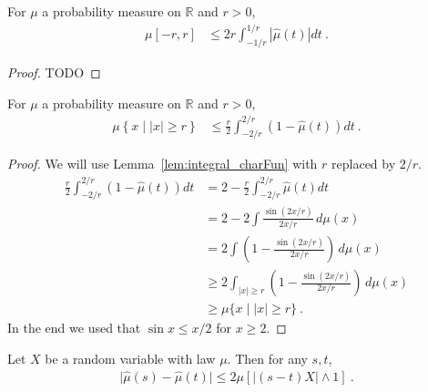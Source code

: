 \begin{lemma}\label{lem:charFun_bound_small}
\leanok
{}
For $\mu$ a probability measure on $\mathbb{R}$ and $r > 0$,
\begin{align*}
\mu [-r, r]
&\le 2 r \int_{-1/r}^{1/r} |\hat{\mu}(t)| dt
\: .
\end{align*}
\end{lemma}

\begin{proof}
TODO
\end{proof}


\begin{lemma}\label{lem:charFun_bound_large}
\leanok
{}
For $\mu$ a probability measure on $\mathbb{R}$ and $r > 0$,
\begin{align*}
\mu \left\{x \mid |x| \ge r\right\}
&\le \frac{r}{2} \int_{-2/r}^{2/r} (1 - \hat{\mu}(t))dt
\: .
\end{align*}
\end{lemma}

\begin{proof}
We will use Lemma~\ref{lem:integral_charFun} with $r$ replaced by $2/r$.
\begin{align*}
    \frac{r}{2} \int_{-2/r}^{2/r} (1 - \hat{\mu}(t))dt
    &= 2 - \frac{r}{2} \int_{-2/r}^{2/r} \hat{\mu}(t)dt
    \\
    &= 2 - 2 \int \frac{\sin(2 x / r)}{2 x / r} \, d\mu(x)
    \\
    &= 2 \int \left(1 - \frac{\sin(2 x / r)}{2 x / r}\right) \, d\mu(x)
    \\
    &\ge 2 \int_{|x| \ge r} \left(1 - \frac{\sin(2 x / r)}{2 x / r}\right) \, d\mu(x)
    \\
    &\ge \mu\{x \mid |x| \ge r\}
    \: .
\end{align*}
In the end we used that $\sin x \le x /2$ for $x \ge 2$.
\end{proof}


\begin{lemma}\label{lem:abs_sub_charFun}
\leanok
{}
Let $X$ be a random variable with law $\mu$. Then for any $s, t$,
\begin{align*}
\vert \hat{\mu}(s) - \hat{\mu}(t) \vert
\le 2 \mu\left[ \left\vert (s - t) X\right\vert \wedge 1\right]
\: .
\end{align*}
\end{lemma}


